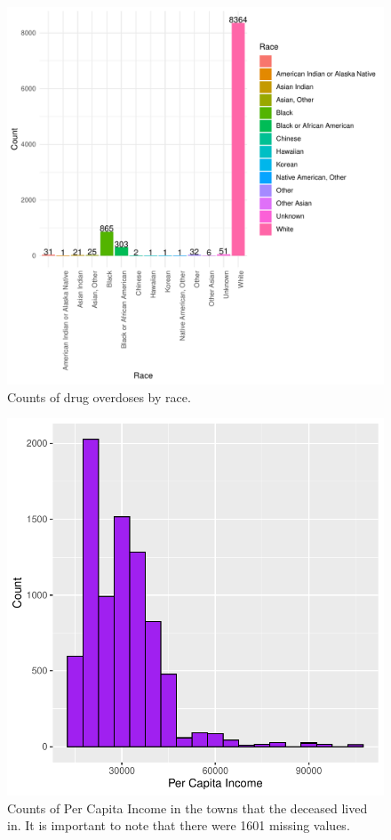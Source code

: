 \documentclass[12pt, letterpaper, titlepage]{article}
\begin{document}
  \begin{figure}[tbp]
    \centering
    \includegraphics{RaceHist}
    \caption{Counts of drug overdoses by race.}
    \label{fig:RaceHist}
  \end{figure}

  \begin{figure}[tbp]
    \centering
    \includegraphics{AgeHistogram}
    \caption{Counts of Per Capita Income in the towns that the deceased lived in.  It is important to note that there were 1601 missing values.}
    \label{fig:MoneyHist}
  \end{figure}
\end{document}
